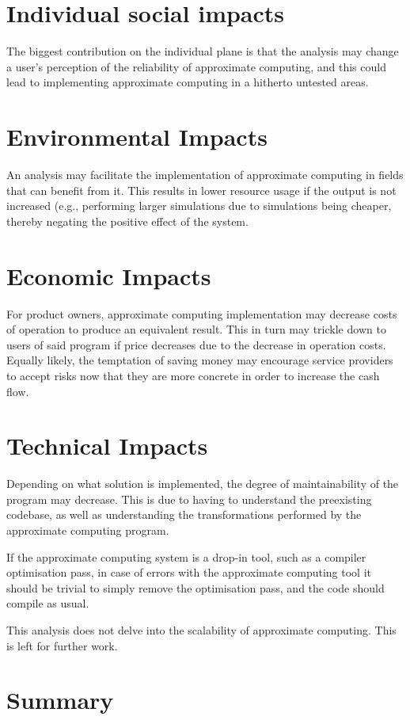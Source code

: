 \section{Individual social impacts}
The biggest contribution on the individual plane is that the analysis may change a user's perception of the reliability of approximate computing, and this could lead to implementing approximate computing in a hitherto untested areas. 


\section{Environmental Impacts}
An analysis may facilitate the implementation of approximate computing in fields that can benefit from it. This results in lower resource usage if the output is not increased (e.g., performing larger simulations due to simulations being cheaper, thereby negating the positive effect of the system.

\section{Economic Impacts}
For product owners, approximate computing implementation may decrease costs of operation to produce an equivalent result. This in turn may trickle down to users of said program if price decreases due to the decrease in operation costs. 
Equally likely, the temptation of saving money may encourage service providers to accept risks now that they are more concrete in order to increase the cash flow.

\section{Technical Impacts}
Depending on what solution is implemented, the degree of maintainability of the program may decrease. This is due to having to understand the preexisting codebase, as well as understanding the transformations performed by the approximate computing program. 

If the approximate computing system is a drop-in tool, such as a compiler optimisation pass, in case of errors with the approximate computing tool it should be trivial to simply remove the optimisation pass, and the code should compile as usual.

This analysis does not delve into the scalability of approximate computing. This is left for further work.


\section{Summary}

